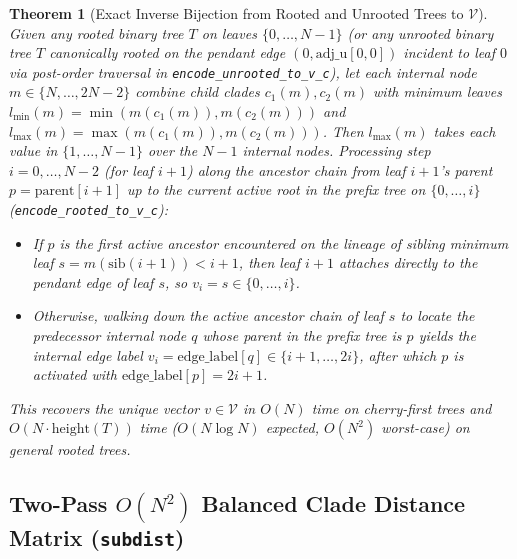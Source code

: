 \documentclass[11pt,a4paper]{article}
\newtheorem{theorem}{Theorem}[section]
\theoremstyle{definition}
\begin{document}
\begin{theorem}[Exact Inverse Bijection from Rooted and Unrooted Trees to $\mathcal{V}$]
\label{thm:inverse}
Given any rooted binary tree $T$ on leaves $\{0, \dots, N-1\}$ (or any unrooted binary tree $T$ canonically rooted on the pendant edge $(0, \text{adj\_u}[0, 0])$ incident to leaf $0$ via post-order traversal in \texttt{encode\_unrooted\_to\_v\_c}), let each internal node $m \in \{N, \dots, 2N-2\}$ combine child clades $c_1(m), c_2(m)$ with minimum leaves $l_{\min}(m) = \min(m(c_1(m)), m(c_2(m)))$ and $l_{\max}(m) = \max(m(c_1(m)), m(c_2(m)))$. Then $l_{\max}(m)$ takes each value in $\{1, \dots, N-1\}$ over the $N-1$ internal nodes. Processing step $i = 0, \dots, N-2$ (for leaf $i + 1$) along the ancestor chain from leaf $i+1$'s parent $p = \text{parent}[i+1]$ up to the current active root in the prefix tree on $\{0, \dots, i\}$ (\texttt{encode\_rooted\_to\_v\_c}):
\begin{itemize}
    \item If $p$ is the first active ancestor encountered on the lineage of sibling minimum leaf $s = m(\text{sib}(i+1)) < i+1$, then leaf $i+1$ attaches directly to the pendant edge of leaf $s$, so $v_i = s \in \{0, \dots, i\}$.
    \item Otherwise, walking down the active ancestor chain of leaf $s$ to locate the predecessor internal node $q$ whose parent in the prefix tree is $p$ yields the internal edge label $v_i = \text{edge\_label}[q] \in \{i+1, \dots, 2i\}$, after which $p$ is activated with $\text{edge\_label}[p] = 2i + 1$.
\end{itemize}
This recovers the unique vector $v \in \mathcal{V}$ in $O(N)$ time on cherry-first trees and $O(N \cdot \text{height}(T))$ time ($O(N \log N)$ expected, $O(N^2)$ worst-case) on general rooted trees.
\end{theorem}

\subsection{Two-Pass $O(N^2)$ Balanced Clade Distance Matrix (\texttt{subdist})}
\end{document}
